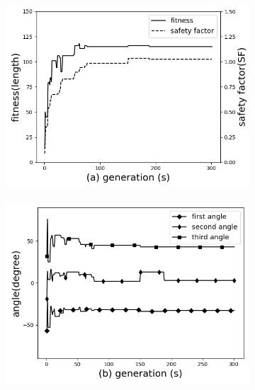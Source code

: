 \begin{figure}[!htb]
	\centering
		\begin{subfigure}[b]{0.8\linewidth}
			\includegraphics[width=\linewidth]{Figures/chapter4_second_three_distinct_angle_fitness_and_sr.png}
		\end{subfigure}

		\begin{subfigure}[b]{0.8\linewidth}
			\includegraphics[width=\linewidth]{Figures/chapter4_second_three_distinct_angle_angle_change.png}
		\end{subfigure}


\end{figure}
